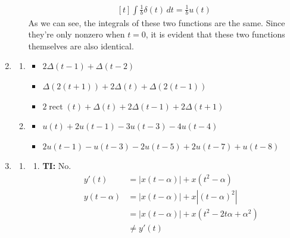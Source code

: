 \documentclass[12pt]{article}
\newcommand{\rect}{\operatorname{rect}}
\begin{document}
\begin{enumerate}
\begin{enumerate}
\[\begin{gathered}[t]
                                    \int \frac{1}{b}\delta(t)\,dt = \frac{1}{b}u(t)
                              \end{gathered}\]
                        As we can see, the integrals of these two functions are the same.
                        Since they're only nonzero when $t=0$, it is evident that
                        these two functions themselves are also identical. $\quad$
            \end{enumerate}
      \item \begin{enumerate}
                  \item \begin{itemize}
                              \item $2\Delta(t-1)+\Delta(t-2)$
                              \item $\Delta(2(t+1))+2\Delta(t)+\Delta(2(t-1))$
                              \item $2\rect(t)+\Delta(t)+2\Delta(t-1)+2\Delta(t+1)$
                        \end{itemize}
                  \item \begin{itemize}
                              \item $u(t)+2u(t-1)-3u(t-3)-4u(t-4)$
                              \item $2u(t-1)-u(t-3)-2u(t-5)+2u(t-7)+u(t-8)$
                        \end{itemize}
            \end{enumerate}
      \item \begin{enumerate}
                  \item \begin{enumerate}
                              \item \textbf{TI:} No.
                                    \begin{align*}
                                          y'(t)       & =|x(t-\alpha)|+x\left(t^2-\alpha\right)            \\
                                          y(t-\alpha) & =|x(t-\alpha)|+x\left|(t-\alpha)^2\right|          \\
                                                      & =|x(t-\alpha)|+x\left(t^2-2t\alpha+\alpha^2\right) \\
                                                      & \ne y'(t)
                                    \end{align*}


\end{enumerate}
\end{enumerate}
\end{enumerate}
\end{document}
